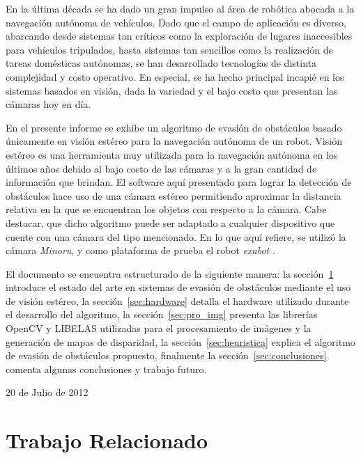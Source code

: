 \documentclass[journal]{IEEEtran}
\begin{document}
En la \'ultima d\'ecada se ha dado un gran impulso al \'area de rob\'otica abocada a la navegaci\'on aut\'onoma de veh\'iculos. Dado que el campo de aplicaci\'on es diverso, abarcando desde sistemas tan cr\'iticos como la exploraci\'on de lugares inaccesibles para veh\'iculos tripulados, hasta sistemas tan sencillos como la realizaci\'on de tareas dom\'esticas aut\'onomas, se han desarrollado tecnolog\'ias de distinta complejidad y costo operativo. En especial, se ha hecho principal incapi\'e en los sistemas basados en visi\'on, dada la variedad y el bajo costo que presentan las c\'amaras hoy en d\'ia.

En el presente informe se exhibe un algoritmo de evasi\'on de obst\'aculos basado \'unicamente en visi\'on est\'ereo para la navegaci\'on aut\'onoma de un robot. Visi\'on est\'ereo es una herramienta muy utilizada para la navegaci\'on aut\'onoma en los \'ultimos a\~nos debido al bajo costo de las c\'amaras y a la gran cantidad de informaci\'on que brindan. El software aqu\'i presentado para lograr la detecci\'on de obst\'aculos hace uso de una c\'amara est\'ereo permitiendo aproximar la distancia relativa en la que se encuentran los objetos con respecto a la c\'amara. Cabe destacar, que dicho algoritmo puede ser adaptado a cualquier dispositivo que cuente con una c\'amara del tipo mencionado. En lo que aqu\'i refiere, se utiliz\'o la c\'amara \emph{Minoru}, y como plataforma de prueba el robot \emph{exabot} \cite{DPSC09}.


El documento se encuentra estructurado de la siguiente manera: la secci\'on~\ref{sec:trabajajo_relacionado} introduce el estado del arte en sistemas de evasi\'on de obst\'aculos mediante el uso de visi\'on est\'ereo, la secci\'on~\ref{sec:hardware} detalla el hardware utilizado durante el desarrollo del algoritmo, la secci\'on~\ref{sec:pro_img} presenta las librer\'ias OpenCV y LIBELAS utilizadas para el procesamiento de im\'agenes y la generaci\'on de mapas de disparidad, la secci\'on~\ref{sec:heuristica} explica el algoritmo de evasi\'on de obst\'aculos propuesto, finalmente la secci\'on~\ref{sec:conclusiones} comenta algunas conclusiones y trabajo futuro.
\medskip

\hfill 20 de Julio de 2012

\section{Trabajo Relacionado}
\label{sec:trabajajo_relacionado}
\end{document}
